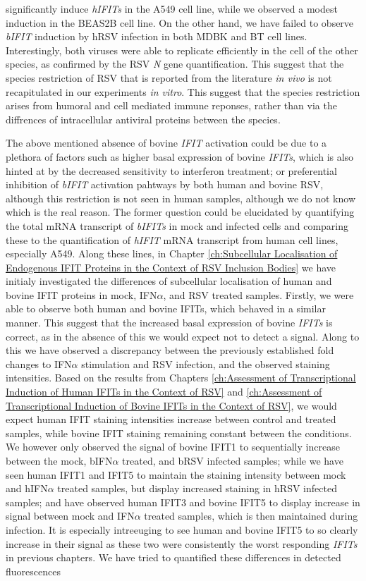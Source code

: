 significantly induce \textit{hIFITs} in the A549 cell line, while we observed a modest induction in the BEAS2B cell line. On the other hand, we have failed to observe \textit{bIFIT} induction by hRSV infection in both MDBK and BT cell lines. Interestingly, both viruses were able to replicate efficiently in the cell of the other species, as confirmed by the RSV \textit{N} gene quantification. This suggest that the species restriction of RSV that is reported from the literature \textit{in vivo} is not recapitulated in our experiments \textit{in vitro}. This suggest that the species restriction arises from humoral and cell mediated immune reponses, rather than via the diffrences of intracellular antiviral proteins between the species.

The above mentioned absence of bovine \textit{IFIT} activation could be due to a plethora of factors such as higher basal expression of bovine \textit{IFITs}, which is also hinted at by the decreased sensitivity to interferon treatment; or preferential inhibition of \textit{bIFIT} activation pahtways by both human and bovine RSV, although this restriction is not seen in human samples, although we do not know which is the real reason. The former question could be elucidated by quantifying the total mRNA transcript of \textit{bIFITs} in mock and infected cells and comparing these to the quantification of \textit{hIFIT} mRNA transcript from human cell lines, especially A549. Along these lines, in Chapter \ref{ch:Subcellular Localisation of Endogenous IFIT Proteins in the Context of RSV Inclusion Bodies} we have initialy investigated the differences of subcellular localisation of human and bovine IFIT proteins in mock, IFN$\alpha$, and RSV treated samples. Firstly, we were able to observe both human and bovine IFITs, which behaved in a similar manner. This suggest that the increased basal expression of bovine \textit{IFITs} is correct, as in the absence of this we would expect not to detect a signal. Along to this we have observed a discrepancy between the previously established fold changes to IFN$\alpha$ stimulation and RSV infection, and the observed staining intensities. Based on the results from Chapters \ref{ch:Assessment of Transcriptional Induction of Human IFITs in the Context of RSV} and \ref{ch:Assessment of Transcriptional Induction of Bovine IFITs in the Context of RSV}, we would expect human IFIT staining intensities increase between control and treated samples, while bovine IFIT staining remaining constant between the conditions. We however only observed the signal of bovine IFIT1 to sequentially increase between the mock, bIFN$\alpha$ treated, and bRSV infected samples; while we have seen human IFIT1 and IFIT5 to maintain the staining intensity between mock and hIFN$\alpha$ treated samples, but display increased staining in hRSV infected samples; and have observed human IFIT3 and bovine IFIT5 to display increase in signal between mock and IFN$\alpha$ treated samples, which is then maintained during infection. It is especially intreeuging to see human and bovine IFIT5 to so clearly increase in their signal as these two were consistently the worst responding \textit{IFITs} in previous chapters. We have tried to quantified these differences in detected fluorescences 